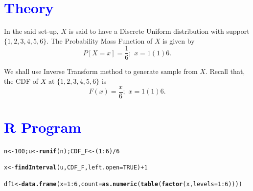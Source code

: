 \documentclass[11pt, a4paper]{article}\usepackage[]{graphicx}\usepackage[]{xcolor}
\makeatletter
\newcommand{\hlnum}[1]{\textcolor[rgb]{0.686,0.059,0.569}{#1}}%
\newcommand{\hlopt}[1]{\textcolor[rgb]{0,0,0}{#1}}%
\newcommand{\hldef}[1]{\textcolor[rgb]{0.345,0.345,0.345}{#1}}%
\newcommand{\hlkwb}[1]{\textcolor[rgb]{0.69,0.353,0.396}{#1}}%
\newcommand{\hlkwc}[1]{\textcolor[rgb]{0.333,0.667,0.333}{#1}}%
\newcommand{\hlkwd}[1]{\textcolor[rgb]{0.737,0.353,0.396}{\textbf{#1}}}%
\newenvironment{kframe}{%
 \def\at@end@of@kframe{}%
 \ifinner\ifhmode%
  \def\at@end@of@kframe{\end{minipage}}%
  \begin{minipage}{\columnwidth}%
 \fi\fi%
 \def\FrameCommand##1{\hskip\@totalleftmargin \hskip-\fboxsep
 \colorbox{shadecolor}{##1}\hskip-\fboxsep
     \hskip-\linewidth \hskip-\@totalleftmargin \hskip\columnwidth}%
 \MakeFramed {\advance\hsize-\width
   \@totalleftmargin\z@ \linewidth\hsize
   \@setminipage}}%
 {\par\unskip\endMakeFramed%
 \at@end@of@kframe}
\newenvironment{knitrout}{}{} %
\makeatother
\begin{document}
\section*{\faArrowAltCircleRight[regular] \textcolor{blue}{Theory}}

In the said set-up, $X$ is said to have a Discrete Uniform distribution with support $\{1, 2, 3, 4, 5, 6\}$. The Probability Mass Function of $X$ is given by
$$P[X = x] = \dfrac{1}{6}; \,\, x = 1(1)6.$$

We shall use Inverse Transform method to generate sample from $X$. Recall that, the CDF of $X$ at $\{1, 2, 3, 4, 5, 6\}$ is 
$$F(x) = \dfrac{x}{6}; \,\, x = 1(1)6.$$

\section*{\faArrowAltCircleRight[regular] \textcolor{blue}{R Program}}



\begin{knitrout}
\color{fgcolor}\begin{kframe}
\begin{alltt}
\hldef{n} \hlkwb{<-} \hlnum{100}\hldef{; u} \hlkwb{<-} \hlkwd{runif}\hldef{(n); CDF_F} \hlkwb{<-} \hldef{(}\hlnum{1}\hlopt{:}\hlnum{6}\hldef{)} \hlopt{/} \hlnum{6}
\end{alltt}
\end{kframe}
\end{knitrout}

\begin{knitrout}
\color{fgcolor}\begin{kframe}
\begin{alltt}
\hldef{x} \hlkwb{<-} \hlkwd{findInterval}\hldef{(u, CDF_F,} \hlkwc{left.open} \hldef{=} \hlnum{TRUE}\hldef{)} \hlopt{+} \hlnum{1}
\end{alltt}
\end{kframe}
\end{knitrout}

\begin{knitrout}
\color{fgcolor}\begin{kframe}
\begin{alltt}
\hldef{df1} \hlkwb{<-} \hlkwd{data.frame}\hldef{(}\hlkwc{x} \hldef{=} \hlnum{1}\hlopt{:}\hlnum{6}\hldef{,} \hlkwc{count} \hldef{=} \hlkwd{as.numeric}\hldef{(}\hlkwd{table}\hldef{(}\hlkwd{factor}\hldef{(x,} \hlkwc{levels} \hldef{=} \hlnum{1}\hlopt{:}\hlnum{6}\hldef{))))}
\end{alltt}
\end{kframe}
\end{knitrout}
\end{document}
